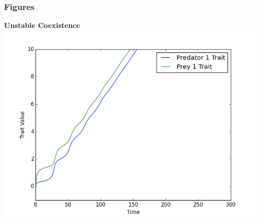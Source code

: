 \documentclass[10pt]{beamer}
\begin{document}
\begin{frame}
	\frametitle{Figures}
	{\bf Unstable Coexistence}
	\includegraphics[scale=0.5]{figures/1x1/traits_unstable_coexistence.png}
\end{frame}
\end{document}
